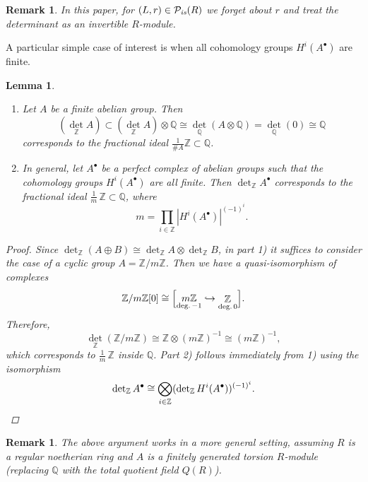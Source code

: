 \documentclass[10pt,a4paper,oneside,draft]{article}
\newcommand{\QQ}{\mathbb{Q}}
\newcommand{\ZZ}{\mathbb{Z}}
\renewcommand{\det}{\operatorname{det}}
\newcommand{\is}{\text{\it is}}
\theoremstyle{myplain}
\newtheorem{lemma}[theorem]{Lemma}
\theoremstyle{mydefinition}
\newtheorem{remark}[theorem]{Remark}
\numberwithin{equation}{section}
\begin{document}
\begin{appendices}
\begin{remark}
  In this paper, for $(L,r) \in \mathcal{P}_\is (R)$ we forget about $r$ and
  treat the determinant as an invertible $R$-module.
\end{remark}

A particular simple case of interest is when all cohomology groups
$H^i (A^\bullet)$ are finite.

\begin{lemma}
  \label{lemma:determinant-for-torsion-cohomology}
  ~

  \begin{enumerate}
  \item[1)] Let $A$ be a finite abelian group. Then
    \[ (\det_\ZZ A) \subset (\det_\ZZ A) \otimes \QQ
      \cong \det_\QQ (A \otimes \QQ) = \det_\QQ (0) \cong \QQ \]
    corresponds to the fractional ideal $\frac{1}{\# A} \ZZ \subset \QQ$.

  \item[2)] In general, let $A^\bullet$ be a perfect complex of abelian groups
    such that the cohomology groups $H^i (A^\bullet)$ are all finite. Then
    $\det_\ZZ A^\bullet$ corresponds to the fractional ideal
    $\frac{1}{m}\,\ZZ \subset \QQ$, where
    $$m = \prod_{i\in \ZZ} |H^i (A^\bullet)|^{(-1)^i}.$$
  \end{enumerate}

  \begin{proof}
    Since $\det_\ZZ (A\oplus B) \cong \det_\ZZ A \otimes \det_\ZZ B$, in
    part 1) it suffices to consider the case of a cyclic group
    $A = \ZZ/m\ZZ$. Then we have a quasi-isomorphism of complexes
    \[ \ZZ/m\ZZ [0] \cong \Bigl[
      \mathop{m\ZZ}_{\text{deg.\,}-1} \hookrightarrow
      \mathop{\ZZ}_{\text{deg.\,}0}
      \Bigr]. \]
    Therefore,
    $$\det_\ZZ (\ZZ/m\ZZ) \cong \ZZ \otimes (m\ZZ)^{-1} \cong (m\ZZ)^{-1},$$
    which corresponds to $\frac{1}{m}\,\ZZ$ inside $\QQ$.
    Part 2) follows immediately from 1) using the isomorphism
    \[ \det_\ZZ A^\bullet \cong
      \bigotimes_{i\in \ZZ} (\det_\ZZ H^i (A^\bullet))^{(-1)^i}. \qedhere \]
  \end{proof}
\end{lemma}

\begin{remark}
  The above argument works in a more general setting, assuming $R$ is a regular
  noetherian ring and $A$ is a finitely generated torsion $R$-module (replacing
  $\QQ$ with the total quotient field $Q (R)$).
\end{remark}

\end{appendices}




\end{document}
